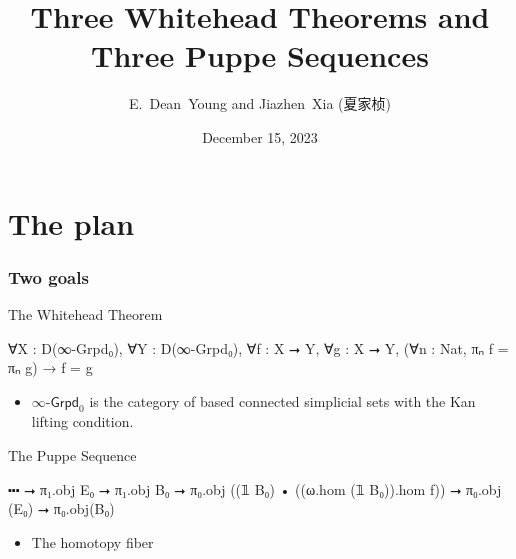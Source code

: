 \documentclass{beamer}
\title{Three Whitehead Theorems and Three Puppe Sequences}
\author{E.~Dean~Young and Jiazhen~Xia (夏家桢)}
\date{December 15, 2023}
\begin{document}
\begin{frame}
\titlepage
\end{frame}


\section{The plan}

\begin{frame}[fragile]
\frametitle{Two goals}
\begin{block}{The Whitehead Theorem}
\begin{leancode}
          ∀X : D(∞-Grpd₀), ∀Y : D(∞-Grpd₀),
          ∀f : X ⭢ Y, ∀g : X ⭢ Y,
          (∀n : Nat, πₙ f = πₙ g) → f = g
\end{leancode}
\end{block}

\begin{itemize}
	\item $\infty$-$\mathsf{Grpd}_0$ is the category of based connected simplicial sets with the Kan lifting condition.
\end{itemize}

\medskip

\begin{block}{The Puppe Sequence}
\begin{leancode}
          ⬝⬝⬝ ⭢ π₁.obj E₀ ⭢ π₁.obj B₀ ⭢
          π₀.obj ((𝟙 B₀) • ((ω.hom (𝟙 B₀)).hom f)) ⭢
          π₀.obj (E₀) ⭢ π₀.obj(B₀)
\end{leancode}
\end{block}

\begin{itemize}
	\item The homotopy fiber
\end{itemize}

\end{frame}

\end{document}
